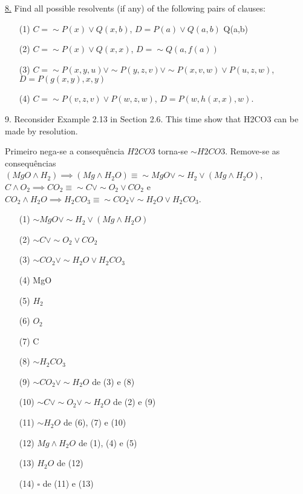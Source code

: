\underline{8.} Find all possible resolvents (if any) of the following pairs of clauses:
\begin{itemize}
 \item[(1)] $ C = \sim P(x) \vee Q(x,b) $, $ D = P(a) \vee Q(a,b) $ \newline
Q(a,b)
 \item[(2)] $ C = \sim P(x) \vee Q(x,x) $, $ D = \sim Q (a,f(a)) $ \newline

 \item[(3)] $ C = \sim P(x,y,u) \vee \sim P(y,z,v) \vee \sim P(x,v,w) \vee P(u,z,w) $, $ D = P(g(x,y),x,y) $ \newline

 \item[(4)] $ C = \sim P(v,z,v) \vee P(w,z,w) $, $ D = P(w,h(x,x),w) $. \newline
\end{itemize}


9. Reconsider Example 2.13 in Section 2.6. This time show that H2CO3 can be made by resolution.

Primeiro nega-se a consequência $H2CO3$ torna-se $ \sim H2CO3 $. Remove-se as consequências $ (MgO \wedge H_2) \implies (Mg \wedge H_2O) \equiv \sim MgO \vee \sim H_2 \vee (Mg \wedge H_2O)$, $ C \wedge O_2 \implies CO_2 \equiv \sim C \vee \sim O_2 \vee CO_2$ e $ CO_2 \wedge H_2O \implies H_2CO_3 \equiv \sim CO_2 \vee \sim H_2O \vee H_2CO_3$.

\begin{itemize}
 \item[(1)] $ \sim MgO \vee \sim H_2 \vee (Mg \wedge H_2O) $
 \item[(2)] $ \sim C \vee \sim O_2 \vee CO_2 $
 \item[(3)] $ \sim CO_2 \vee \sim H_2O \vee H_2CO_3 $
 \item[(4)] MgO
 \item[(5)] $ H_2 $
 \item[(6)] $ O_2 $
 \item[(7)] C
 \item[(8)] $ \sim H_2CO_3 $
 \item[(9)] $ \sim CO_2 \vee \sim H_2O $ de (3) e (8)
 \item[(10)] $ \sim C \vee \sim O_2 \vee \sim H_2O $ de (2) e (9)
 \item[(11)] $ \sim H_2O $ de (6), (7) e (10)
 \item[(12)] $ Mg \wedge H_2O $ de (1), (4) e (5)
 \item[(13)] $ H_2O $ de (12)
 \item[(14)] $ \square $ de (11) e (13)
\end{itemize}

